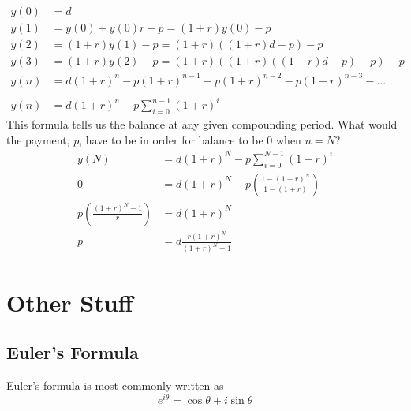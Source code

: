 \documentclass[11pt]{book}
\begin{document}
\begin{align*}
y(0) &= d \\
y(1) &= y(0) + y(0)r - p = (1+r)y(0) -p\\
y(2) &= (1+r)y(1) -p = (1+r)((1+r)d -p) -p \\
y(3) &= (1+r)y(2) -p = (1+r)((1+r)((1+r)d -p) -p) -p \\
y(n) &= d(1+r)^n -p(1+r)^{n-1} -p(1+r)^{n-2} -p(1+r)^{n-3} - ...\\
\\
y(n) &= d(1+r)^n -p\sum\limits_{i=0}^{n-1}{{(1+r)}^i}
\end{align*}
This formula tells us the balance at any given compounding period.  What would the payment, \(p\), have to be in order for balance to be 0 when \(n=N\)?\\
\begin{align*}
y(N) &= d(1+r)^N -p\sum\limits_{i=0}^{N-1}{{(1+r)}^i} \\
0 &= d(1+r)^N -p\left( \frac{1-(1+r)^N}{1-(1+r)} \right) \\
p\left( \frac{(1+r)^N -1}{r} \right) &= d(1+r)^N \\
p &= d\frac{r(1+r)^N}{(1+r)^N -1}
\end{align*}

\chapter{Other Stuff}

\section{Euler's Formula}
Euler's formula is most commonly written as 
\[e^{i\theta} = \cos{\theta} + i\sin{\theta}\]
\end{document}
